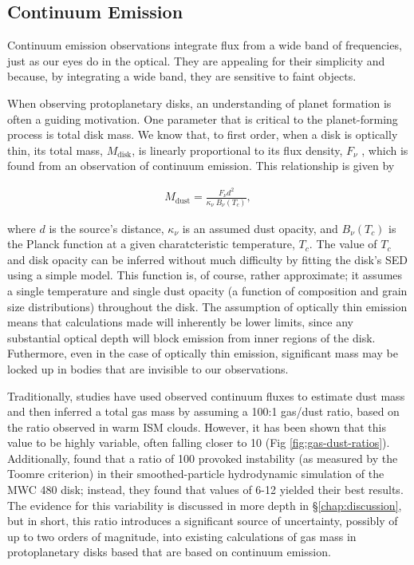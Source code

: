 \subsection{Continuum Emission}
\label{section:continuum_emission}

Continuum emission observations integrate flux from a wide band of frequencies, just as our eyes do in the optical. They are appealing for their simplicity and because, by integrating a wide band, they are sensitive to faint objects.

When observing protoplanetary disks, an understanding of planet formation is often a guiding motivation. One parameter that is critical to the planet-forming process is total disk mass. We know that, to first order, when a disk is optically thin, its total mass, $M_{\text{disk}}$, is linearly proportional to its flux density, $F_{\nu}$ \citep{Hildebrand1983}, which is found from an observation of continuum emission. This relationship is given by

\begin{align}
M_{\text{dust}} = \frac{F_{\nu} d^2}{\kappa_{\nu}\ B_{\nu}(T_c)},
\end{align}

where $d$ is the source's distance, $\kappa_{\nu}$ is an assumed dust opacity, and $B_{\nu}(T_c)$ is the Planck function at a given charatcteristic temperature, $T_c$. The value of $T_c$ and disk opacity can be inferred without much difficulty by fitting the disk's SED using a simple model. This function is, of course, rather approximate; it assumes a single temperature and single dust opacity (a function of composition and grain size distributions) throughout the disk. The assumption of optically thin emission means that calculations made will inherently be lower limits, since any substantial optical depth will block emission from inner regions of the disk. Futhermore, even in the case of optically thin emission, significant mass may be locked up in bodies that are invisible to our observations.

Traditionally, studies have used observed continuum fluxes to estimate dust mass and then inferred a total gas mass by assuming a 100:1 gas/dust ratio, based on the ratio observed in warm ISM clouds. However, it has been shown \citep[e.g][]{Miotello2016,Miotello2017} that this value to be highly variable, often falling closer to 10 (Fig \ref{fig:gas-dust-ratios}). Additionally, \citet{Liu2018} found that a ratio of 100 provoked instability (as measured by the Toomre criterion) in their smoothed-particle hydrodynamic simulation of the MWC 480 disk; instead, they found that values of 6-12 yielded their best results. The evidence for this variability is discussed in more depth in \S\ref{chap:discussion}, but in short, this ratio introduces a significant source of uncertainty, possibly of up to two orders of magnitude, into existing calculations of gas mass in protoplanetary disks based that are based on continuum emission.



